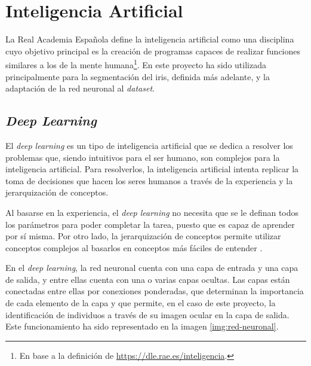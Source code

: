 \section{Inteligencia Artificial}

La Real Academia Española define la inteligencia artificial como una disciplina cuyo objetivo principal es la creación de programas capaces de realizar funciones similares a los de la mente humana\footnote{En base a la definición de \url{https://dle.rae.es/inteligencia}.}. 
En este proyecto ha sido utilizada principalmente para la segmentación del iris, definida más adelante, y la adaptación de la red neuronal al \textit{dataset}.

\subsection{\textit{Deep Learning}}

El \textit{deep learning} es un tipo de inteligencia artificial que se dedica a resolver los problemas que, siendo intuitivos para el ser humano, son complejos para la inteligencia artificial. Para resolverlos, la inteligencia artificial intenta replicar la toma de decisiones que hacen los seres humanos a través de la experiencia y la jerarquización de conceptos. 

Al basarse en la experiencia, el \textit{deep learning} no necesita que se le definan todos los parámetros para poder completar la tarea, puesto que es capaz de aprender por sí misma. Por otro lado, la jerarquización de conceptos permite utilizar conceptos complejos 
al basarlos en conceptos más fáciles de entender \cite{Goodfellow-et-al-2016}.

En el \textit{deep learning}, la red neuronal cuenta con una capa de entrada y una capa de salida, y entre ellas cuenta con una o varias capas ocultas. 
Las capas están conectadas entre ellas por conexiones ponderadas, que determinan la importancia de cada elemento de la capa y que permite, en el caso de este proyecto, la identificación de individuos a través de su imagen ocular en la capa de salida. Este funcionamiento ha sido representado en la imagen \ref{img:red-neuronal}.



